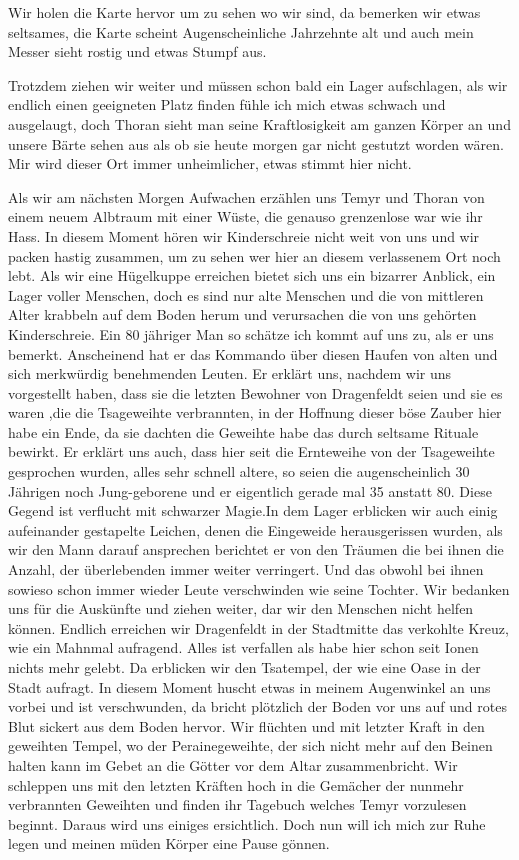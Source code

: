 Wir holen die Karte hervor um zu sehen wo wir sind, da bemerken wir etwas seltsames, die Karte scheint Augenscheinliche Jahrzehnte alt und auch mein Messer sieht rostig und etwas Stumpf aus.

Trotzdem ziehen wir weiter und müssen schon bald ein Lager aufschlagen, als wir endlich einen geeigneten Platz finden fühle ich mich etwas schwach und ausgelaugt, doch Thoran sieht man seine Kraftlosigkeit am ganzen Körper an und unsere Bärte sehen aus als ob sie heute morgen gar nicht gestutzt worden wären. Mir wird dieser Ort immer unheimlicher, etwas stimmt hier nicht.

Als wir am nächsten Morgen Aufwachen erzählen uns Temyr und Thoran von einem neuem Albtraum mit einer Wüste, die genauso grenzenlose war wie ihr Hass. In diesem Moment hören wir Kinderschreie nicht weit von uns und wir packen hastig zusammen, um zu sehen wer hier an diesem verlassenem Ort noch lebt. Als wir eine Hügelkuppe erreichen bietet sich uns ein bizarrer Anblick, ein Lager voller Menschen, doch es sind nur alte Menschen und die von mittleren Alter
krabbeln auf dem Boden herum und verursachen die von uns gehörten Kinderschreie. Ein 80 jähriger Man so schätze ich kommt auf uns zu, als er uns bemerkt. Anscheinend hat er das Kommando über diesen Haufen von alten und sich merkwürdig benehmenden Leuten. Er erklärt uns, nachdem wir uns vorgestellt haben, dass sie die letzten Bewohner von Dragenfeldt   seien und sie es waren ,die die Tsageweihte verbrannten, in der Hoffnung dieser böse Zauber hier habe ein Ende, da sie dachten die Geweihte habe das durch seltsame Rituale bewirkt. Er erklärt uns auch, dass hier seit die Ernteweihe von der Tsageweihte gesprochen wurden, alles sehr schnell altere, so seien die augenscheinlich 30 Jährigen noch Jung-geborene und er eigentlich gerade mal 35 anstatt 80. Diese Gegend ist verflucht mit schwarzer Magie.In dem Lager erblicken wir auch einig aufeinander gestapelte Leichen, denen die Eingeweide herausgerissen wurden, als wir den Mann darauf ansprechen berichtet er von den Träumen die bei ihnen die Anzahl, der überlebenden immer weiter verringert. Und das obwohl bei ihnen sowieso schon immer wieder Leute verschwinden wie seine Tochter. Wir bedanken uns für die Auskünfte und ziehen weiter, dar wir den Menschen nicht helfen können. Endlich erreichen wir Dragenfeldt  in der Stadtmitte das verkohlte Kreuz, wie ein Mahnmal aufragend. Alles ist verfallen als habe hier schon seit Ionen nichts mehr gelebt. Da erblicken wir den Tsatempel, der wie eine Oase in der Stadt aufragt. In diesem Moment huscht etwas in meinem Augenwinkel an uns vorbei und ist verschwunden, da bricht plötzlich der Boden vor uns auf und rotes Blut sickert aus dem Boden hervor. Wir flüchten und mit letzter Kraft in den geweihten Tempel, wo der Perainegeweihte, der sich nicht mehr auf den Beinen halten kann im Gebet an die Götter vor dem Altar zusammenbricht. Wir schleppen uns mit den letzten Kräften hoch in die Gemächer der nunmehr verbrannten Geweihten und finden ihr Tagebuch welches Temyr vorzulesen beginnt. Daraus wird uns einiges ersichtlich. Doch nun will ich mich zur Ruhe legen und meinen müden Körper eine Pause gönnen.


